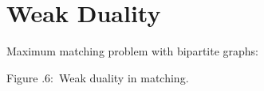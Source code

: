 \documentclass[twoside]{article}
\newcounter{lecnum}
\newcommand{\fig}[3]{
      \vspace{#2}
      \begin{center}
      Figure \thelecnum.#1:~#3
      \end{center}
  }
\begin{document}
\section{Weak Duality}

Maximum matching problem with bipartite graphs:

\begin{center}
\end{center}
\fig{6}{0in}{Weak duality in matching.}
\end{document}
